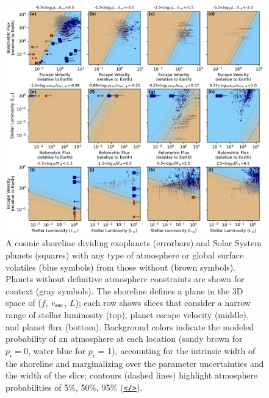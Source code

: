\documentclass[modern,linenumbers,trackchanges]{aastex7}
\begin{document}
\begin{figure}[ht!]
\includegraphics[width=\textwidth]{figures/grid-of-shorelines-any.pdf}
\caption{A cosmic shoreline dividing exoplanets (errorbars) and Solar System planets (squares) with any type of atmosphere or global surface volatiles (blue symbols) from those without (brown symbols). Planets without definitive atmosphere constraints are shown for context (gray symbols). The shoreline defines a plane in the 3D space of ($f$, $v_{\sf esc}$, $L$); each row shows slices that consider a narrow range of stellar luminosity (top), planet escape velocity (middle), and planet flux (bottom). Background colors indicate the modeled probability of an atmosphere at each location (sandy brown for $p_i = 0$, water blue for $p_i$ = 1), accounting for the intrinsic width of the shoreline and marginalizing over the parameter uncertainties and the width of the slice; contours (dashed lines) highlight atmosphere probabilities of 5\%, 50\%, 95\% (\href{https://github.com/zkbt/shoreline/blob/main/notebooks/plot-shorelines.ipynb}{\texttt{</>}}).}
\label{f:shoreline-any}
\end{figure}
\end{document}
